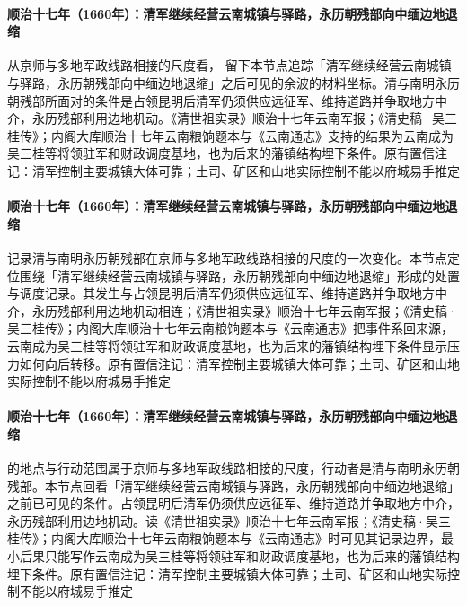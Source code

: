 \paragraph{顺治十七年（1660年）：清军继续经营云南城镇与驿路，永历朝残部向中缅边地退缩}
从京师与多地军政线路相接的尺度看， 留下本节点追踪「清军继续经营云南城镇与驿路，永历朝残部向中缅边地退缩」之后可见的余波的材料坐标。清与南明永历朝残部所面对的条件是占领昆明后清军仍须供应远征军、维持道路并争取地方中介，永历残部利用边地机动。《清世祖实录》顺治十七年云南军报；《清史稿·吴三桂传》；内阁大库顺治十七年云南粮饷题本与《云南通志》支持的结果为云南成为吴三桂等将领驻军和财政调度基地，也为后来的藩镇结构埋下条件。原有置信注记：清军控制主要城镇大体可靠；土司、矿区和山地实际控制不能以府城易手推定

\paragraph{顺治十七年（1660年）：清军继续经营云南城镇与驿路，永历朝残部向中缅边地退缩}
 记录清与南明永历朝残部在京师与多地军政线路相接的尺度的一次变化。本节点定位围绕「清军继续经营云南城镇与驿路，永历朝残部向中缅边地退缩」形成的处置与调度记录。其发生与占领昆明后清军仍须供应远征军、维持道路并争取地方中介，永历残部利用边地机动相连；《清世祖实录》顺治十七年云南军报；《清史稿·吴三桂传》；内阁大库顺治十七年云南粮饷题本与《云南通志》把事件系回来源，云南成为吴三桂等将领驻军和财政调度基地，也为后来的藩镇结构埋下条件显示压力如何向后转移。原有置信注记：清军控制主要城镇大体可靠；土司、矿区和山地实际控制不能以府城易手推定

\paragraph{顺治十七年（1660年）：清军继续经营云南城镇与驿路，永历朝残部向中缅边地退缩}
 的地点与行动范围属于京师与多地军政线路相接的尺度，行动者是清与南明永历朝残部。本节点回看「清军继续经营云南城镇与驿路，永历朝残部向中缅边地退缩」之前已可见的条件。占领昆明后清军仍须供应远征军、维持道路并争取地方中介，永历残部利用边地机动。读《清世祖实录》顺治十七年云南军报；《清史稿·吴三桂传》；内阁大库顺治十七年云南粮饷题本与《云南通志》时可见其记录边界，最小后果只能写作云南成为吴三桂等将领驻军和财政调度基地，也为后来的藩镇结构埋下条件。原有置信注记：清军控制主要城镇大体可靠；土司、矿区和山地实际控制不能以府城易手推定

